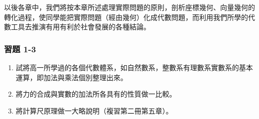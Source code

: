 以後各章中，我們將按本章所述處理實際問題的原則，剖析座標幾何、向量幾何的轉化過程，使同學能把實際問題（經由幾何）化成代數問題，而利用我們所學的代數工具去推演有用有利於社會發展的各種結論。

\subsubsection*{習題 1-3}

\begin{enumerate}[label=\arabic*., leftmargin=2em]
  \item 試將高一所學過的各個代數體系，如自然數系，整數系有理數系實數系的基本運算，即加法與乘法個別整理出來。
  \item 將力的合成與實數的加法所各具有的性質做一比較。
  \item 將計算尺原理做一大略說明（複習第二冊第五章）。
\end{enumerate}
